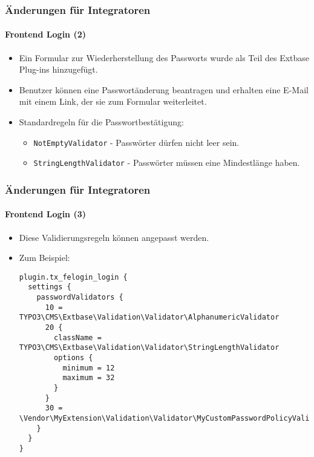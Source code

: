 
\begin{frame}[fragile]
	\frametitle{Änderungen für Integratoren}
	\framesubtitle{Frontend Login (2)}

	\begin{itemize}

		\item Ein Formular zur Wiederherstellung des Passworts wurde als Teil des Extbase Plug-ins hinzugefügt.
		\item Benutzer können eine Passwortänderung beantragen und erhalten eine E-Mail mit einem Link, der sie zum Formular weiterleitet.
		\item Standardregeln für die Passwortbestätigung:

			\begin{itemize}
				\item \texttt{NotEmptyValidator} - Passwörter dürfen nicht leer sein.
				\item \texttt{StringLengthValidator} - Passwörter müssen eine Mindestlänge haben.
			\end{itemize}

	\end{itemize}

\end{frame}


\begin{frame}[fragile]
	\frametitle{Änderungen für Integratoren}
	\framesubtitle{Frontend Login (3)}

	\lstset{basicstyle=\tiny\ttfamily}

	\begin{itemize}
		\item Diese Validierungsregeln können angepasst werden.
		\item Zum Beispiel:
\begin{lstlisting}
plugin.tx_felogin_login {
  settings {
    passwordValidators {
      10 = TYPO3\CMS\Extbase\Validation\Validator\AlphanumericValidator
      20 {
        className = TYPO3\CMS\Extbase\Validation\Validator\StringLengthValidator
        options {
          minimum = 12
          maximum = 32
        }
      }
      30 = \Vendor\MyExtension\Validation\Validator\MyCustomPasswordPolicyValidator
    }
  }
}
\end{lstlisting}

	\end{itemize}

\end{frame}

